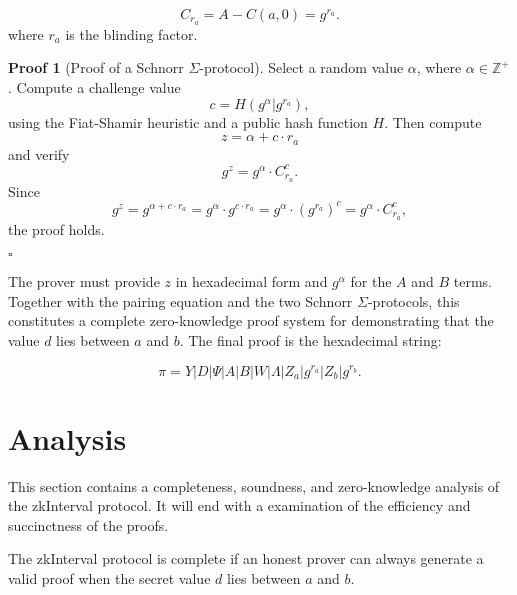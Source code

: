 \documentclass{iacrcc}
\theoremstyle{definition}
\newtheorem{namedproof}{Proof}
\begin{document}
\begin{equation}
C_{r_a} = A - C(a, 0) = g^{r_{a}}.
\end{equation}
where \( r_{a} \) is the blinding factor. 

\begin{namedproof}[Proof of a Schnorr $\Sigma$-protocol]
Select a random value \( \alpha \), where \( \alpha \in \mathbb{Z}^+ \). Compute a challenge value
\begin{equation}
c = H(g^{\alpha} | g^{r_{a}}), 
\end{equation}
using the Fiat-Shamir heuristic and a public hash function \( H \). Then compute 
\begin{equation}
z = \alpha + c \cdot r_{a}
\end{equation}
and verify
\begin{equation}
g^{z} = g^{\alpha} \cdot C_{r_a}^{c}.
\end{equation}
Since 
\begin{equation}
g^{z} = g^{\alpha + c \cdot r_{a}} = g^{\alpha} \cdot g^{c \cdot r_{a}} = g^{\alpha} \cdot (g^{r_{a}})^{c} = g^{\alpha} \cdot C_{r_a}^{c},
\end{equation}
the proof holds.
\begin{center}
\( \square \)
\end{center} 
\end{namedproof}

The prover must provide \( z \) in hexadecimal form and \( g^{\alpha} \) for the \( A \) and \( B \) terms. Together with the pairing equation and the two Schnorr $\Sigma$-protocols, this constitutes a complete zero-knowledge proof system for demonstrating that the value \( d \) lies between \( a \) and \( b \). The final proof is the hexadecimal string:

\begin{equation}
\pi = Y | D | \Psi | A | B | W | \Lambda | Z_{a} | g^{r_{a}} | Z_{b} | g^{r_{b}}.
\end{equation}

\section{Analysis}

This section contains a completeness, soundness, and zero-knowledge analysis of the zkInterval protocol. It will end with a examination of the efficiency and succinctness of the proofs.

The zkInterval protocol is complete if an honest prover can always generate a valid proof when the secret value \( d \) lies between \( a \) and \( b \).
\end{document}
